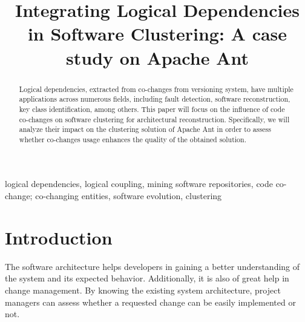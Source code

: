 \documentclass[conference]{IEEEtran}
\begin{document}
\title{Integrating Logical Dependencies in Software Clustering: A case study on Apache Ant}

\author{
\and
{}
}

\maketitle

\begin{abstract}
Logical dependencies, extracted from co-changes from versioning system, have multiple applications across numerous fields, including fault detection, software reconstruction, key class identification, among others. This paper will focus on the influence of code co-changes on software clustering for architectural reconstruction. Specifically, we will analyze their impact on the clustering solution of Apache Ant in order to assess whether co-changes usage enhances the quality of the obtained solution.
\end{abstract}

\begin{IEEEkeywords}
logical dependencies, logical coupling, mining software repositories, code co-change; co-changing entities, software evolution, clustering
\end{IEEEkeywords}

\section{Introduction}

The software architecture helps developers in gaining a better understanding of the system and its expected behavior. Additionally, it is also of great help in change management. By knowing the existing system architecture, project managers can assess whether a requested change can be easily implemented or not.
\end{document}
